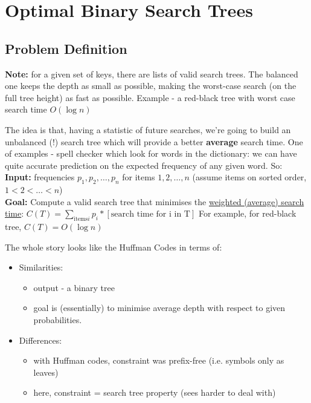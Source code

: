 \documentclass{scrartcl}
\begin{document}
\section{Optimal Binary Search Trees}
\label{sec:12-1}
\subsection{Problem Definition}
\label{sec:12-1-1}
{\bf Note: } for a given set of keys, there are lists of valid search trees. The
balanced one keeps the depth as small as possible, making the worst-case search
(on the full tree height) as fast as possible. Example - a red-black tree with
worst case search time $O(\log n)$

The idea is that, having a statistic of future searches, we're going to build an
unbalanced (!) search tree which will provide a better {\bf average } search
time. One of examples - spell checker which look for words in the dictionary: we
can have quite accurate prediction on the expected frequency of any given word.
So:\\
{\bf Input: } frequencies $p_1, p_2, \dots, p_n$ for items $1, 2, \dots, n$
(assume items on sorted order, $1 < 2 < \dots < n$)\\
{\bf Goal: } Compute a valid search tree that minimises the \underline{weighted
  (average) search time}: $C(T) = \sum\limits_{\text{items} i} p_i *
[\text{search time for i in T}]$ For example, for red-black tree, $C(T) = O(\log
n)$ 

The whole story looks like the Huffman Codes in terms of:
\begin{itemize}
\item Similarities:
  \begin{itemize}
  \item output - a binary tree
  \item goal is (essentially) to minimise average depth with respect to given
    probabilities.
  \end{itemize}
\item Differences:
  \begin{itemize}
  \item with Huffman codes, constraint was prefix-free (i.e. symbols only as
    leaves) 
  \item here, constraint = search tree property (sees harder to deal with)
  \end{itemize}
\end{itemize}

\end{document}
